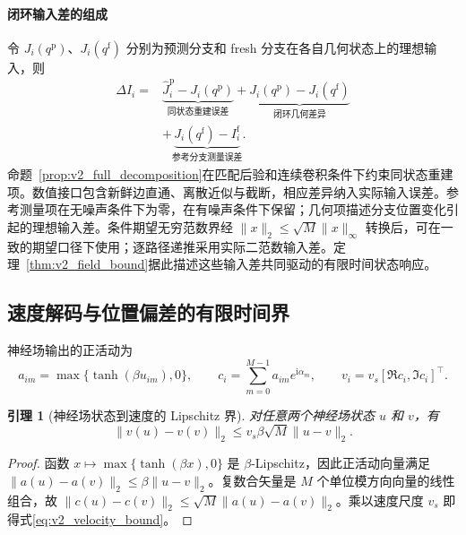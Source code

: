 \documentclass[UTF8,fontset=windows,11pt]{ctexart}
\newtheorem{lemma}[theorem]{引理}
\begin{document}
\paragraph{闭环输入差的组成}
令 $J_i(q^{\mathrm p})$、$J_i(q^{\mathrm f})$ 分别为预测分支和 fresh 分支在各自几何状态上的理想输入，则
\begin{equation}
\begin{aligned}
\Delta I_i={}&\underbrace{\widehat J_i^{\mathrm p}-J_i(q^{\mathrm p})}_{\text{同状态重建误差}}
+\underbrace{J_i(q^{\mathrm p})-J_i(q^{\mathrm f})}_{\text{闭环几何差异}}\\
&+\underbrace{J_i(q^{\mathrm f})-I_i^{\mathrm f}}_{\text{参考分支测量误差}}.
\end{aligned}
\label{eq:geometry_feedback_gap}
\end{equation}
命题~\ref{prop:v2_full_decomposition}在匹配后验和连续卷积条件下约束同状态重建项。数值接口包含新鲜边直通、离散近似与截断，相应差异纳入实际输入误差。参考测量项在无噪声条件下为零，在有噪声条件下保留；几何项描述分支位置变化引起的理想输入差。条件期望无穷范数界经 $\|x\|_2\le\sqrt M\|x\|_\infty$ 转换后，可在一致的期望口径下使用；逐路径递推采用实际二范数输入差。定理~\ref{thm:v2_field_bound}据此描述这些输入差共同驱动的有限时间状态响应。

\subsection{速度解码与位置偏差的有限时间界}

神经场输出的正活动为
\begin{equation}
 a_{im}=\max\{\tanh(\beta u_{im}),0\},
 \qquad
 c_i=\sum_{m=0}^{M-1}a_{im}e^{\mathrm i\alpha_m},
 \qquad
 v_i=v_s[\Re c_i,\Im c_i]^{\top}.
 \label{eq:v2_velocity_decode}
\end{equation}

\begin{lemma}[神经场状态到速度的 Lipschitz 界]
\label{lem:v2_velocity_bound}
对任意两个神经场状态 $u$ 和 $v$，有
\begin{equation}
 \|v(u)-v(v)\|_2
 \le v_s\beta\sqrt M\|u-v\|_2.
 \label{eq:v2_velocity_bound}
\end{equation}
\end{lemma}

\begin{proof}
函数 $x\mapsto\max\{\tanh(\beta x),0\}$ 是 $\beta$-Lipschitz，因此正活动向量满足
\(\|a(u)-a(v)\|_2\le\beta\|u-v\|_2\)。复数合矢量是 $M$ 个单位模方向向量的线性组合，故
\(\|c(u)-c(v)\|_2\le\sqrt M\|a(u)-a(v)\|_2\)。乘以速度尺度 $v_s$ 即得式\eqref{eq:v2_velocity_bound}。
\end{proof}
\end{document}
